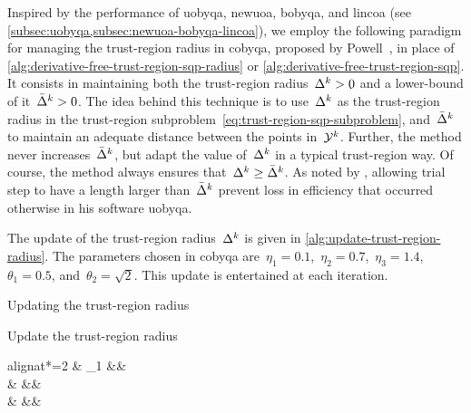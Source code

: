 Inspired by the performance of \gls{uobyqa}, \gls{newuoa}, \gls{bobyqa}, and \gls{lincoa} (see \cref{subsec:uobyqa,subsec:newuoa-bobyqa-lincoa}), we employ the following paradigm for managing the trust-region radius in \gls{cobyqa}, proposed by Powell~\cite{Powell_2002,Powell_2006,Powell_2009}, in place of \cref{alg:derivative-free-trust-region-sqp-radius} or \cref{alg:derivative-free-trust-region-sqp}.
It consists in maintaining both the trust-region radius~$\rad[k] > 0$ and a lower-bound of it~$\radlb[k] > 0$.
The idea behind this technique is to use~$\rad[k]$ as the trust-region radius in the trust-region subproblem~\cref{eq:trust-region-sqp-subproblem}, and~$\radlb[k]$ to maintain an adequate distance between the points in~$\xpt[k]$.
Further, the method never increases~$\radlb[k]$, but adapt the value of~$\rad[k]$ in a typical trust-region way.
Of course, the method always ensures that~$\rad[k] \ge \radlb[k]$.
As noted by \citeauthor{Powell_2002}, allowing trial step to have a length larger than~$\radlb[k]$ prevent loss in efficiency that occurred otherwise in his software \gls{uobyqa}.

The update of the trust-region radius~$\rad[k]$ is given in \cref{alg:update-trust-region-radius}.
The parameters chosen in \gls{cobyqa} are~$\eta_1 = 0.1$,~$\eta_2 = 0.7$,~$\eta_3 = 1.4$,~$\theta_1 = 0.5$, and~$\theta_2 = \sqrt{2}$.
This update is entertained at each iteration.

\begin{algorithm}
    \caption{Updating the trust-region radius}
    \label{alg:update-trust-region-radius}
    \DontPrintSemicolon
    \onehalfspacing
    Update the trust-region radius
    \begin{algoempheq}[left={\rad[k + 1] \gets \empheqlbrace}]{alignat*=2}
        & \theta_1 \rad[k]                                                                      && \quad {}\\
        & \min \set{\theta_1 \rad[k], \norm{\step}}                                             && \quad {}\\
        & \min {}  && \quad {}
    \end{algoempheq}
    \If{$\rad[k + 1] \le \eta_3 \radlb[k]$}{
        $\rad[k + 1] \gets \radlb[k]$\;
    }
\end{algorithm}

